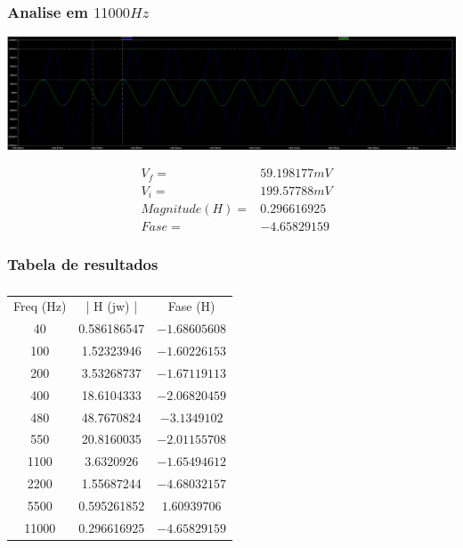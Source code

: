 \documentclass[12pt,twoside, a4paper, twocolumn]{article}
\begin{document}
\subsubsection{Analise em $11000Hz$}

\begin{adjustbox}{scale=0.09}
    \includegraphics{ltfreq11000.png}
\end{adjustbox}

\begin{equation*}
    \begin{aligned}
         & V_f =          & 59.198177mV \\
         & V_i =          & 199.57788mV \\
         & Magnitude(H) = & 0.296616925 \\
         & Fase =         & -4.65829159
    \end{aligned}
\end{equation*}

\subsubsection{Tabela de resultados}



\subparagraph*{}

\begin{center}
    \begin{tabular}{ |c|c|c| }
        \hline
        Freq (Hz) & | H (jw) |  & Fase (H)      \\
        40        & 0.586186547 & $-1.68605608$ \\
        100       & 1.52323946  & $-1.60226153$ \\
        200       & 3.53268737  & $-1.67119113$ \\
        400       & 18.6104333  & $-2.06820459$ \\
        480       & 48.7670824  & $-3.1349102$  \\
        550       & 20.8160035  & $-2.01155708$ \\
        1100      & 3.6320926   & $-1.65494612$ \\
        2200      & 1.55687244  & $-4.68032157$ \\
        5500      & 0.595261852 & $1.60939706$  \\
        11000     & 0.296616925 & $-4.65829159$ \\
        \hline
    \end{tabular}
\end{center}
\newpage
\end{document}

